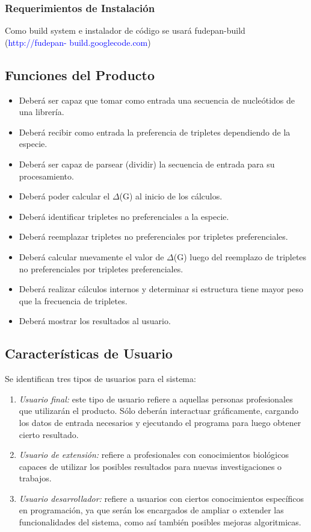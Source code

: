 \documentclass[10pt,a4paper,english,spanish]{article}
\begin{document}
	\subsubsection{Requerimientos de Instalación}
		Como build system e instalador de código se usará fudepan-build (\textcolor{blue}{http://fudepan-	build.googlecode.com}) 

\subsection{Funciones del Producto}
	\begin{itemize}
		\item Deberá ser capaz que tomar como entrada una secuencia de nucleótidos de una librería.
		\item Deberá recibir como entrada la preferencia de tripletes dependiendo de la especie.	
		\item Deberá ser capaz de parsear (dividir) la secuencia de entrada para su procesamiento.
		\item Deberá poder calcular el $\Delta$(G) al inicio de los cálculos.
		\item Deberá identificar tripletes no preferenciales a la especie.
 		\item Deberá reemplazar tripletes no preferenciales por tripletes preferenciales.
		\item Deberá calcular nuevamente el valor de $\Delta$(G) luego del reemplazo de tripletes no 			  				preferenciales por tripletes preferenciales.
		\item Deberá realizar cálculos internos y determinar si estructura tiene mayor peso que la frecuencia de 				  tripletes.
		\item Deberá mostrar los resultados al usuario.
	\end{itemize}

\subsection{Características de Usuario}
	Se identifican tres tipos de usuarios para el sistema:
	\begin{enumerate}
 		\item \textit{Usuario final:} este tipo de usuario refiere a aquellas personas profesionales que utilizarán el 										producto. Sólo deberán interactuar gráficamente, cargando los datos de entrada 										necesarios y ejecutando el programa para luego obtener cierto resultado. 
		\item \textit{Usuario de extensión:} refiere a profesionales con conocimientos biológicos capaces de utilizar los 												posibles resultados para nuevas investigaciones o trabajos.
		\item \textit{Usuario desarrollador:} refiere a usuarios con ciertos conocimientos específicos en programación, 											ya que serán los encargados de ampliar o extender las funcionalidades del 												sistema, como así también posibles mejoras algoritmicas.
	\end{enumerate}
\end{document}
